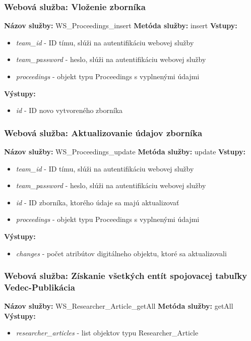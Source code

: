 \documentclass[10pt,oneside,slovak,a4paper]{article}
\begin{document}
\subsubsection{Webová služba: Vloženie zborníka}
\textbf{Názov služby:} WS\_Proceedings\_insert
\textbf{Metóda služby:} insert
\textbf{Vstupy:}
	\begin{itemize}
		\item \textit{team\_id} - ID tímu, slúži na autentifikáciu webovej služby
		\item \textit{team\_password} - heslo, slúži na autentifikáciu webovej služby
		\item \textit{proceedings} - objekt typu Proceedings s vyplnenými údajmi
	\end{itemize}
\textbf{Výstupy:}
	\begin{itemize}
		\item \textit{id} - ID novo vytvoreného zborníka
	\end{itemize}
	
\subsubsection{Webová služba: Aktualizovanie údajov zborníka}
\textbf{Názov služby:} WS\_Proceedings\_update
\textbf{Metóda služby:} update
\textbf{Vstupy:}
	\begin{itemize}
		\item \textit{team\_id} - ID tímu, slúži na autentifikáciu webovej služby
		\item \textit{team\_password} - heslo, slúži na autentifikáciu webovej služby
		\item \textit{id} - ID zborníka, ktorého údaje sa majú aktualizovať
		\item \textit{proceedings} - objekt typu Proceedings s vyplnenými údajmi
	\end{itemize}
\textbf{Výstupy:}
	\begin{itemize}
		\item \textit{changes} - počet atribútov digitálneho objektu, ktoré sa aktualizovali
	\end{itemize}
	
\subsubsection{Webová služba: Získanie všetkých entít spojovacej tabuľky Vedec-Publikácia}
\textbf{Názov služby:} WS\_Researcher\_Article\_getAll
\textbf{Metóda služby:} getAll
\textbf{Výstupy:}
	\begin{itemize}
		\item \textit{researcher\_articles} - list objektov typu Researcher\_Article
	\end{itemize}
	
\end{document}

